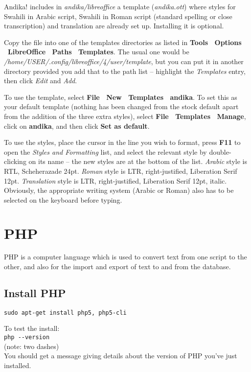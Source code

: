 \documentclass[a4paper,10pt]{article}
\begin{document}
Andika! includes in \textit{andika/libreoffice} a template (\textit{andika.ott}) where styles for Swahili in Arabic script, Swahili in Roman script (standard spelling or close transcription) and translation are already set up.  Installing it is optional.

Copy the file into one of the templates directories as listed in \textbf{Tools \textrightarrow\ Options \textrightarrow\ LibreOffice \textrightarrow\ Paths \textrightarrow\ Templates}.  The usual one would be \textit{/home/USER/.config/libreoffice/4/user/template}, but you can put it in another directory provided you add that to the path list -- highlight the \textit{Templates} entry, then click \textit{Edit} and \textit{Add}.

To use the template, select \textbf{File \textrightarrow\ New \textrightarrow\ Templates \textrightarrow\ andika}.  To set this as your default template (nothing has been changed from the stock default apart from the addition of the three extra styles), select \textbf{File \textrightarrow\ Templates \textrightarrow\ Manage}, click on \textbf{andika}, and then click \textbf{Set as default}.

To use the styles, place the cursor in the line you wish to format, press \textbf{F11} to open the \textit{Styles and Formatting} list, and select the relevant style by double-clicking on its name -- the new styles are at the bottom of the list.   \textit{Arabic} style is RTL, Scheherazade 24pt.  \textit{Roman} style is LTR, right-justified, Liberation Serif 12pt.  \textit{Translation} style is LTR, right-justified, Liberation Serif 12pt, italic.  Obviously, the appropriate writing system (Arabic or Roman) also has to be selected on the keyboard before typing.


\section{PHP}

PHP is a computer language which is used to convert text from one script to the other, and also for the import and export of text to and from the database.

\subsection{Install PHP}

\verb|sudo apt-get install php5, php5-cli|

To test the install:\\
\verb|php --version|\\
(note: two dashes)\\
You should get a message giving details about the version of PHP you've just installed.
\end{document}
